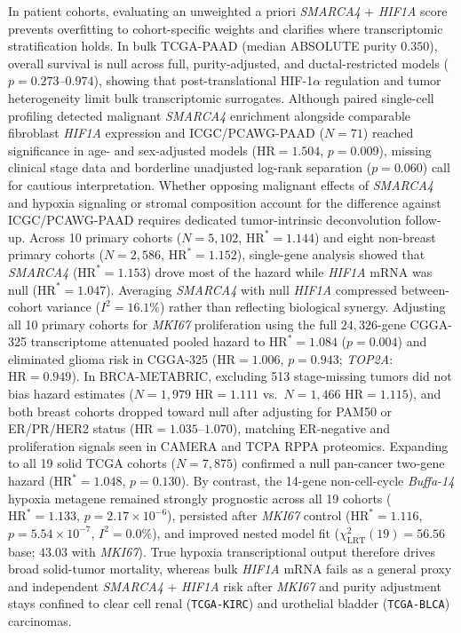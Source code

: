 \documentclass[10pt,twocolumn]{article}
\begin{document}
In patient cohorts, evaluating an unweighted a priori \textit{SMARCA4} + \textit{HIF1A} score prevents overfitting to cohort-specific weights and clarifies where transcriptomic stratification holds. In bulk TCGA-PAAD (median ABSOLUTE purity $0.350$), overall survival is null across full, purity-adjusted, and ductal-restricted models ($p = 0.273\text{--}0.974$), showing that post-translational HIF-1$\alpha$ regulation and tumor heterogeneity limit bulk transcriptomic surrogates. Although paired single-cell profiling detected malignant \textit{SMARCA4} enrichment alongside comparable fibroblast \textit{HIF1A} expression and ICGC/PCAWG-PAAD ($N = 71$) reached significance in age- and sex-adjusted models ($\text{HR} = 1.504$, $p = 0.009$), missing clinical stage data and borderline unadjusted log-rank separation ($p = 0.060$) call for cautious interpretation. Whether opposing malignant effects of \textit{SMARCA4} and hypoxia signaling or stromal composition account for the difference against ICGC/PCAWG-PAAD requires dedicated tumor-intrinsic deconvolution follow-up. Across 10 primary cohorts ($N = 5,102$, $\text{HR}^* = 1.144$) and eight non-breast primary cohorts ($N = 2,586$, $\text{HR}^* = 1.152$), single-gene analysis showed that \textit{SMARCA4} ($\text{HR}^* = 1.153$) drove most of the hazard while \textit{HIF1A} mRNA was null ($\text{HR}^* = 1.047$). Averaging \textit{SMARCA4} with null \textit{HIF1A} compressed between-cohort variance ($I^2 = 16.1\%$) rather than reflecting biological synergy. Adjusting all 10 primary cohorts for \textit{MKI67} proliferation using the full $24,326$-gene CGGA-325 transcriptome attenuated pooled hazard to $\text{HR}^* = 1.084$ ($p = 0.004$) and eliminated glioma risk in CGGA-325 ($\text{HR} = 1.006$, $p = 0.943$; \textit{TOP2A}: $\text{HR} = 0.949$). In BRCA-METABRIC, excluding 513 stage-missing tumors did not bias hazard estimates ($N = 1,979$ $\text{HR} = 1.111$ vs.\ $N = 1,466$ $\text{HR} = 1.115$), and both breast cohorts dropped toward null after adjusting for PAM50 or ER/PR/HER2 status ($\text{HR} = 1.035\text{--}1.070$), matching ER-negative and proliferation signals seen in CAMERA and TCPA RPPA proteomics. Expanding to all 19 solid TCGA cohorts ($N = 7,875$) confirmed a null pan-cancer two-gene hazard ($\text{HR}^* = 1.048$, $p = 0.130$). By contrast, the 14-gene non-cell-cycle \textit{Buffa-14} hypoxia metagene \cite{buffa2010} remained strongly prognostic across all 19 cohorts ($\text{HR}^* = 1.133$, $p = 2.17 \times 10^{-6}$), persisted after \textit{MKI67} control ($\text{HR}^* = 1.116$, $p = 5.54 \times 10^{-7}$, $I^2 = 0.0\%$), and improved nested model fit ($\chi^2_{\text{LRT}}(19) = 56.56$ base; $43.03$ with \textit{MKI67}). True hypoxia transcriptional output therefore drives broad solid-tumor mortality, whereas bulk \textit{HIF1A} mRNA fails as a general proxy and independent \textit{SMARCA4} + \textit{HIF1A} risk after \textit{MKI67} and purity adjustment stays confined to clear cell renal (\texttt{TCGA-KIRC}) and urothelial bladder (\texttt{TCGA-BLCA}) carcinomas.
\end{document}
